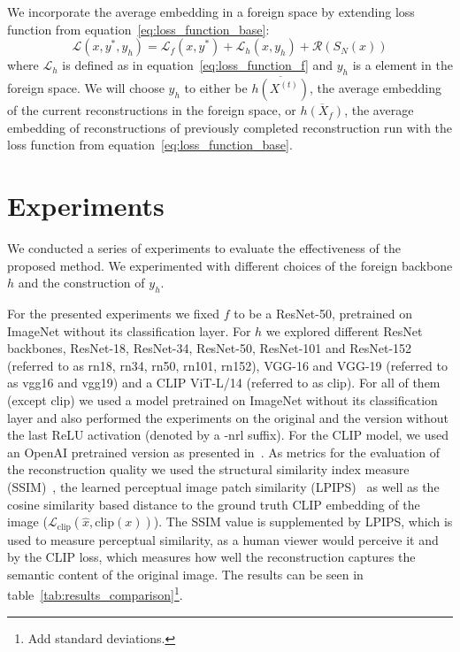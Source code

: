 \documentclass[10pt,twocolumn]{article}
\begin{document}
We incorporate the average embedding in a foreign space by extending loss function from equation~\ref{eq:loss_function_base}:
\begin{equation}\label{eq:loss_function}
\mathcal{L}(x, y^*, y_h) = \mathcal{L}_{f}(x, y^*) + \mathcal{L}_{h}(x, y_h) + \mathcal{R}(S_N(x))
\end{equation}
where $\mathcal{L}_{h}$ is defined as in equation~\ref{eq:loss_function_f} and $y_h$ is a element in the foreign space.
We will choose $y_h$ to either be $\overline{h(X^{(t)})}$, the average embedding of the current reconstructions in the foreign space, or $\overline{h(X_f)}$, the average embedding of reconstructions of previously completed reconstruction run with the loss function from equation~\ref{eq:loss_function_base}.

\section{Experiments}
We conducted a series of experiments to evaluate the effectiveness of the proposed method.
We experimented with different choices of the foreign backbone $h$ and the construction of $y_h$.

For the presented experiments we fixed $f$ to be a ResNet-50, pretrained on ImageNet without its classification layer.
For $h$ we explored different ResNet backbones, ResNet-18, ResNet-34, ResNet-50, ResNet-101 and ResNet-152 (referred to as rn18, rn34, rn50, rn101, rn152), VGG-16 and VGG-19 (referred to as vgg16 and vgg19) and a CLIP ViT-L/14 (referred to as clip).
For all of them (except clip) we used a model pretrained on ImageNet without its classification layer and also performed the experiments on the original and the version without the last ReLU activation (denoted by a -nrl suffix).
For the CLIP model, we used an OpenAI pretrained version as presented in~\cite{radfordLearningTransferableVisual2021}.
As metrics for the evaluation of the reconstruction quality we used the structural similarity index measure (SSIM)~\cite{zhouwangImageQualityAssessment2004}, the learned perceptual image patch similarity (LPIPS)~\cite{zhangUnreasonableEffectivenessDeep2018} as well as the cosine similarity based distance to the ground truth CLIP embedding of the image ($\mathcal{L}_{\text{clip}}(\hat x, \text{clip}(x))$).
The SSIM value is supplemented by LPIPS, which is used to measure perceptual similarity, as a human viewer would perceive it and by the CLIP loss, which measures how well the reconstruction captures the semantic content of the original image.
The results can be seen in table~\ref{tab:results_comparison}\footnote{Add standard deviations.}.
\end{document}
